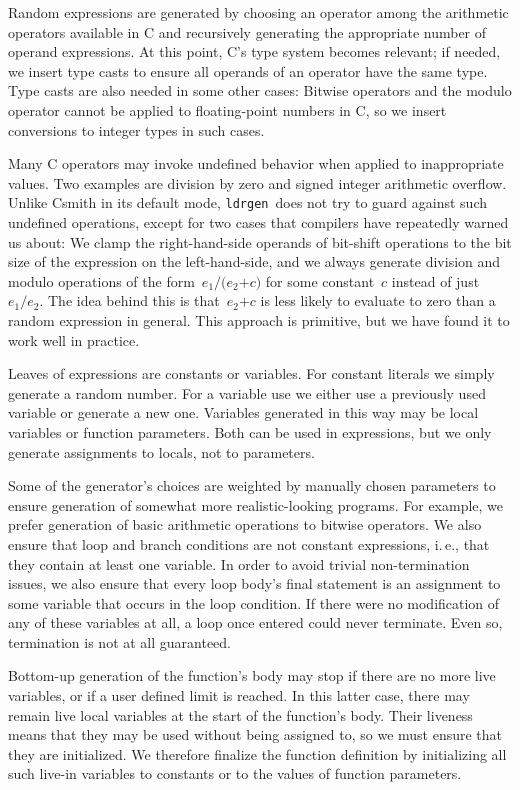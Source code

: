 \documentclass[a4paper]{easychair}
\newcommand\ldrgen{\texttt{ldrgen}}
\begin{document}
Random expressions are generated by choosing an operator among the
arithmetic operators available in C and recursively generating the
appropriate number of operand expressions. At this point, C's type system
becomes relevant; if needed, we insert type casts to ensure all operands of
an operator have the same type. Type casts are also needed in some other
cases: Bitwise operators and the modulo operator cannot be applied to
floating-point numbers in C, so we insert conversions to integer types in
such cases.

Many C operators may invoke undefined behavior when applied to inappropriate
values. Two examples are division by zero and signed integer arithmetic
overflow. Unlike Csmith in its default mode, \ldrgen\ does not try to guard
against such undefined operations, except for two cases that compilers have
repeatedly warned us about: We clamp the right-hand-side operands of
bit-shift operations to the bit size of the expression on the
left-hand-side, and we always generate division and modulo operations of the
form~\(e_1 \mathtt{/} \mathtt{(}e_2 \mathtt{+} c\mathtt{)}\) for some
constant~\(c\) instead of just~\(e_1 \mathtt{/} e_2\). The idea behind this
is that~\(e_2 \mathtt{+} c\) is less likely to evaluate to zero than a
random expression in general. This approach is primitive, but we have found
it to work well in practice.

Leaves of expressions are constants or variables. For constant literals we
simply generate a random number. For a variable use we either use a
previously used variable or generate a new one. Variables generated in
this way may be local variables or function parameters. Both can be used in
expressions, but we only generate assignments to locals, not to parameters.

Some of the generator's choices are weighted by manually chosen parameters
to ensure generation of somewhat more realistic-looking programs. For
example, we prefer generation of basic arithmetic operations to bitwise
operators. We also ensure that loop and branch conditions are not constant
expressions, i.\,e., that they contain at least one variable. In order to
avoid trivial non-termination issues, we also ensure that every loop body's
final statement is an assignment to some variable that occurs in the loop
condition. If there were no modification of any of these variables at all, a
loop once entered could never terminate. Even so, termination is not at all
guaranteed.

Bottom-up generation of the function's body may stop if there are no more
live variables, or if a user defined limit is reached. In this
latter case, there may remain live local variables at the start of the
function's body. Their liveness means that they may be used without being
assigned to, so we must ensure that they are initialized. We therefore
finalize the function definition by initializing all such live-in variables
to constants or to the values of function parameters.
\end{document}
